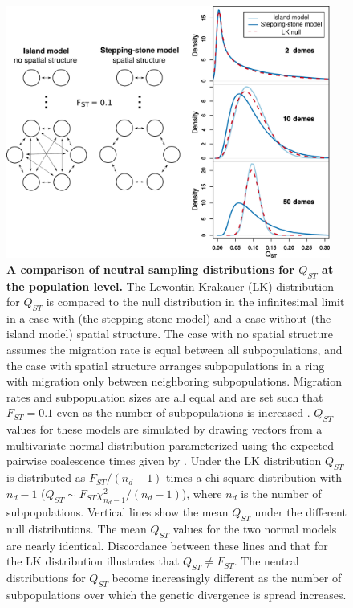 \begin{figure}
  \centering
  \includegraphics[width=0.95\textwidth]{./figures/pop_struct_combine_alt.pdf}
  \caption{ \textbf{A comparison of neutral sampling distributions for $Q_{ST}$
      at the population level.} The Lewontin-Krakauer (LK) distribution for
    $Q_{ST}$ is compared to the null distribution in the infinitesimal limit in
    a case with (the stepping-stone model) and a case without (the island model)
    spatial structure. The case with no spatial structure assumes the migration
    rate is equal between all subpopulations, and the case with spatial
    structure arranges subpopulations in a ring with migration only between
    neighboring subpopulations. Migration rates and subpopulation sizes are all
    equal and are set such that $F_{ST}=0.1$ even as the number of
    subpopulations is increased \citep{Slatkin1991}. $Q_{ST}$ values for these
    models are simulated by drawing vectors from a multivariate normal
    distribution parameterized using the expected pairwise coalescence times
    given by \citep{Slatkin1991}. Under the LK distribution $Q_{ST}$ is
    distributed as $F_{ST}/(n_d - 1)$ times a chi-square distribution with $n_d
    - 1$ ($Q_{ST}\sim F_{ST}\chi^2_{n_d - 1}/(n_d-1)$), where $n_d$ is the
    number of subpopulations. Vertical lines show the mean $Q_{ST}$ under the
    different null distributions. The mean $Q_{ST}$ values for the two normal
    models are nearly identical. Discordance between these lines and that for
    the LK distribution illustrates that $Q_{ST} \neq F_{ST}$. The neutral
    distributions for $Q_{ST}$ become increasingly different as the number of
    subpopulations over which the genetic divergence is spread increases.}
  \label{fig:qst_deme}
\end{figure}

